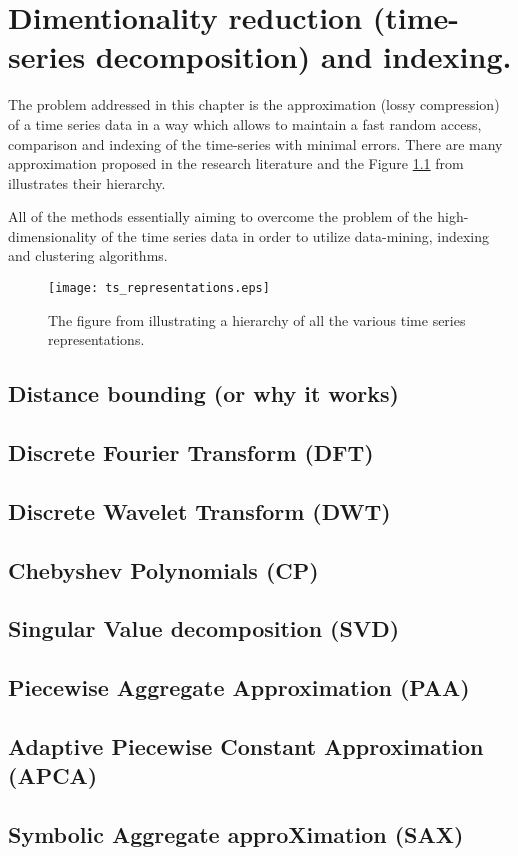 \chapter{Dimentionality reduction (time-series decomposition) and indexing.}
The problem addressed in this chapter is the approximation (lossy compression) of a time series data in a way which allows to maintain a fast random access, comparison and indexing of the time-series with minimal errors. There are many approximation proposed in the research literature and the Figure \ref{fig:approximations} from \cite{citeulike:2821475} illustrates their hierarchy.

All of the methods essentially aiming to overcome the problem of the high-dimensionality of the time series data in order to utilize data-mining, indexing and clustering algorithms. 


\begin{figure}[tbp]
   \centering
   \texttt{[image: ts\_representations.eps]}
   \caption{The figure from \cite{citeulike:2821475} illustrating a hierarchy of all the various time series representations.}
   \label{fig:approximations}
\end{figure} 

\section{Distance bounding (or why it works)}

\section{Discrete Fourier Transform (DFT)}

\section{Discrete Wavelet Transform (DWT)}

\section{Chebyshev Polynomials (CP)}

\section{Singular Value decomposition (SVD)}

\section{Piecewise Aggregate Approximation (PAA)}

\section{Adaptive Piecewise Constant Approximation (APCA)}

\section{Symbolic Aggregate approXimation (SAX)}